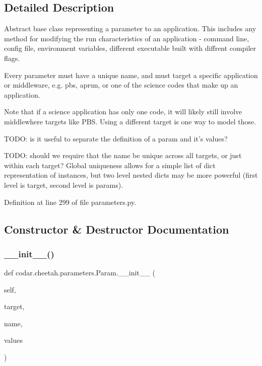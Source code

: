 \subsection{Detailed Description}
\begin{DoxyVerb}Abstract base class representing a parameter to an application. This
includes any method for modifying the run characteristics of an
application - command line, config file, environment variables, different
executable built with diffrent compiler flags.

Every parameter must have a unique name, and must target a specific
application or middleware, e.g. pbs, aprun, or one of the science
codes that make up an application.

Note that if a science application has only one code, it will likely still
involve middlewhere targets like PBS. Using a different target is one way
to model those.

TODO: is it useful to separate the definition of a param and it's values?

TODO: should we require that the name be unique across all targets, or
just within each target? Global uniqueness allows for a simple list of
dict representation of instances, but two level nested dicts may be
more powerful (first level is target, second level is params).\end{DoxyVerb}
 

Definition at line 299 of file parameters.\+py.



\subsection{Constructor \& Destructor Documentation}
\mbox{\label{classcodar_1_1cheetah_1_1parameters_1_1_param_a4c91917ddd306f143286037d02b78034}} 
\subsubsection{\texorpdfstring{\+\_\+\+\_\+init\+\_\+\+\_\+()}{\_\_init\_\_()}}
{\footnotesize\ttfamily def codar.\+cheetah.\+parameters.\+Param.\+\_\+\+\_\+init\+\_\+\+\_\+ (\begin{DoxyParamCaption}\item[{}]{self,  }\item[{}]{target,  }\item[{}]{name,  }\item[{}]{values }\end{DoxyParamCaption})}



